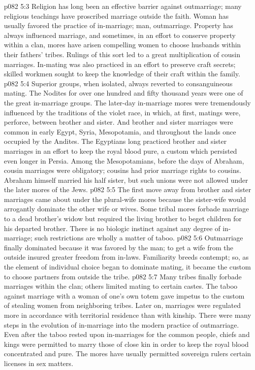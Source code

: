 \vs p082 5:3 \pc Religion has long been an effective barrier against outmarriage; many religious teachings have proscribed marriage outside the faith. Woman has usually favored the practice of in\hyp{}marriage; man, outmarriage. Property has always influenced marriage, and sometimes, in an effort to conserve property within a clan, mores have arisen compelling women to choose husbands within their fathers’ tribes. Rulings of this sort led to a great multiplication of cousin marriages. In\hyp{}mating was also practiced in an effort to preserve craft secrets; skilled workmen sought to keep the knowledge of their craft within the family.
\vs p082 5:4 \pc Superior groups, when isolated, always reverted to consanguineous mating. The Nodites for over one hundred and fifty thousand years were one of the great in\hyp{}marriage groups. The later\hyp{}day in\hyp{}marriage mores were tremendously influenced by the traditions of the violet race, in which, at first, matings were, perforce, between brother and sister. And brother and sister marriages were common in early Egypt, Syria, Mesopotamia, and throughout the lands once occupied by the Andites. The Egyptians long practiced brother and sister marriages in an effort to keep the royal blood pure, a custom which persisted even longer in Persia. Among the Mesopotamians, before the days of Abraham, cousin marriages were obligatory; cousins had prior marriage rights to cousins. Abraham himself married his half sister, but such unions were not allowed under the later mores of the Jews.
\vs p082 5:5 The first move away from brother and sister marriages came about under the plural\hyp{}wife mores because the sister\hyp{}wife would arrogantly dominate the other wife or wives. Some tribal mores forbade marriage to a dead brother’s widow but required the living brother to beget children for his departed brother. There is no biologic instinct against any degree of in\hyp{}marriage; such restrictions are wholly a matter of taboo.
\vs p082 5:6 \pc Outmarriage finally dominated because it was favored by the man; to get a wife from the outside insured greater freedom from in\hyp{}laws. Familiarity breeds contempt; so, as the element of individual choice began to dominate mating, it became the custom to choose partners from outside the tribe.
\vs p082 5:7 Many tribes finally forbade marriages within the clan; others limited mating to certain castes. The taboo against marriage with a woman of one’s own totem gave impetus to the custom of stealing women from neighboring tribes. Later on, marriages were regulated more in accordance with territorial residence than with kinship. There were many steps in the evolution of in\hyp{}marriage into the modern practice of outmarriage. Even after the taboo rested upon in\hyp{}marriages for the common people, chiefs and kings were permitted to marry those of close kin in order to keep the royal blood concentrated and pure. The mores have usually permitted sovereign rulers certain licenses in sex matters.
